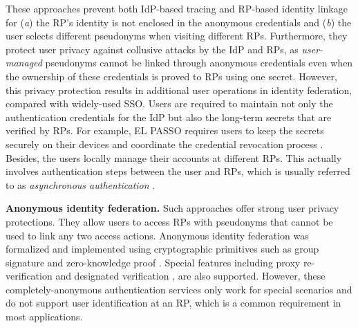 These approaches prevent both IdP-based tracing and RP-based identity linkage for (\emph{a}) the RP's identity is not enclosed in the anonymous credentials and (\emph{b}) the user selects different pseudonyms when visiting different RPs.
Furthermore, they protect user privacy against collusive attacks by the IdP and RPs, as \emph{user-managed} pseudonyms cannot be linked through anonymous credentials \cite{anon-credential-2001, idemix, anon-credential} even when the ownership of these credentials is proved to RPs using one secret.
\newc
However, this privacy protection results in additional user operations in identity federation, compared with widely-used SSO.
Users are required to maintain not only the authentication credentials for the IdP but also the long-term secrets that are verified by RPs.
\oldc
For example, EL PASSO \cite{ELPASSO} requires users to keep the secrets securely on their devices and coordinate the credential revocation process \cite{ELPASSO, UnlimitID}.
Besides, the users locally manage their accounts at different RPs. This actually involves authentication steps between the user and RPs, which is usually referred to as \emph{asynchronous authentication} \cite{ELPASSO}.


\newc
\noindent\textbf{Anonymous identity federation.}
Such approaches offer strong user privacy protections. They allow users to access RPs with pseudonyms that cannot be used to link any two access actions.
\oldc
Anonymous identity federation was formalized \cite{WangWS13} and implemented using cryptographic primitives such as group signature and zero-knowledge proof \cite{WangWS13, HanCSTWW20, HanCSTW18}. Special features including proxy re-verification \cite{HanCSTWW20} and designated verification \cite{HanCSTW18}, are also supported. %
However, these completely-anonymous authentication services only work for special scenarios and do not support user identification at an RP, which is a common requirement in most applications.
